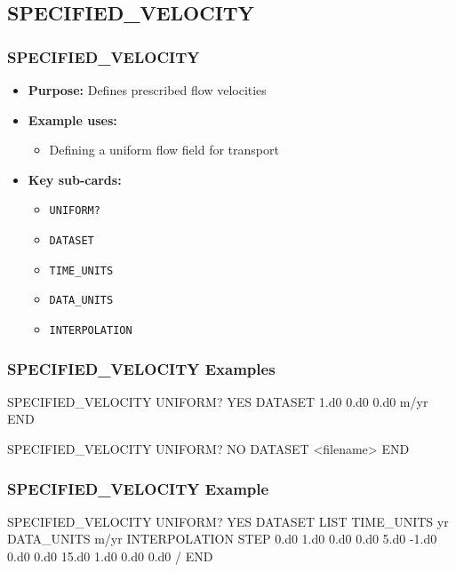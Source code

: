 \subsection{SPECIFIED\_VELOCITY}

\begin{frame}\frametitle{SPECIFIED\_VELOCITY}

\begin{itemize}
\item[] \textbf{Purpose:} Defines prescribed flow velocities
\item[] \textbf{Example uses:}
\begin{itemize}
  \item Defining a uniform flow field for transport
\end{itemize}
\item[] \textbf{Key sub-cards:}
\begin{itemize}
  \item[] \verb|UNIFORM?|
  \item[] \verb|DATASET|
  \item[] \verb|TIME_UNITS|
  \item[] \verb|DATA_UNITS|
  \item[] \verb|INTERPOLATION|
\end{itemize}
\end{itemize}

\end{frame}

\begin{frame}[fragile]\frametitle{SPECIFIED\_VELOCITY Examples}

\begin{semiverbatim}
SPECIFIED_VELOCITY
  UNIFORM? YES
  DATASET 1.d0 0.d0 0.d0 m/yr
END


SPECIFIED_VELOCITY
  UNIFORM? NO
  DATASET <filename>
END
\end{semiverbatim}

\end{frame}

\begin{frame}[fragile]\frametitle{SPECIFIED\_VELOCITY Example}

\begin{semiverbatim}
SPECIFIED_VELOCITY
  UNIFORM? YES
  DATASET LIST
    TIME_UNITS yr
    DATA_UNITS m/yr
    INTERPOLATION STEP
    0.d0 1.d0 0.d0 0.d0
    5.d0 -1.d0 0.d0 0.d0
    15.d0 1.d0 0.d0 0.d0
  /
END
\end{semiverbatim}

\end{frame}
